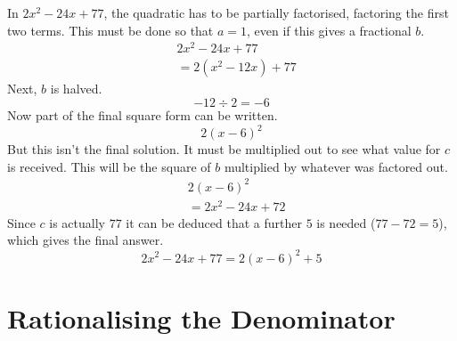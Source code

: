 In $2x^2-24x+77$, the quadratic has to be partially factorised, factoring the first two terms. This must be done so that $a=1$, even if this gives a fractional $b$.
\begin{align*}
	&2x^2-24x+77\\
	&=2(x^2-12x)+77
\end{align*}
Next, $b$ is halved.
\begin{equation*}
	-12 \div 2 = -6
\end{equation*}
Now part of the final square form can be written.
\begin{equation*}
	2(x-6)^2
\end{equation*}
But this isn't the final solution. It must be multiplied out to see what value for $c$ is received. This will be the square of $b$ multiplied by whatever was factored out.
\begin{align*}
	&2(x-6)^2\\
	&=2x^2-24x+72
\end{align*}
Since $c$ is actually $77$ it can be deduced that a further $5$ is needed ($77-72=5$), which gives the final answer.
\begin{equation*}
	2x^2 - 24x + 77 = 2(x-6)^2+5
\end{equation*}

\section{Rationalising the Denominator}
